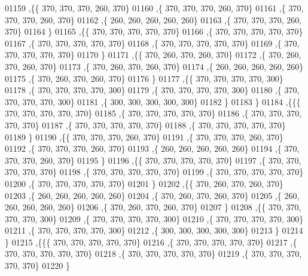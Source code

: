 \begin{DoxyCode}
01159   ,\{\{   370,   370,   370,   260,   370\}
01160    ,\{   370,   370,   370,   260,   370\}
01161    ,\{   370,   370,   370,   260,   370\}
01162    ,\{   260,   260,   260,   260,   260\}
01163    ,\{   370,   370,   370,   260,   370\}
01164    \}
01165   ,\{\{   370,   370,   370,   370,   370\}
01166    ,\{   370,   370,   370,   370,   370\}
01167    ,\{   370,   370,   370,   370,   370\}
01168    ,\{   370,   370,   370,   370,   370\}
01169    ,\{   370,   370,   370,   370,   370\}
01170    \}
01171   ,\{\{   370,   260,   370,   260,   370\}
01172    ,\{   370,   260,   370,   260,   370\}
01173    ,\{   370,   260,   370,   260,   370\}
01174    ,\{   260,   260,   260,   260,   260\}
01175    ,\{   370,   260,   370,   260,   370\}
01176    \}
01177   ,\{\{   370,   370,   370,   370,   300\}
01178    ,\{   370,   370,   370,   370,   300\}
01179    ,\{   370,   370,   370,   370,   300\}
01180    ,\{   370,   370,   370,   370,   300\}
01181    ,\{   300,   300,   300,   300,   300\}
01182    \}
01183   \}
01184  ,\{\{\{   370,   370,   370,   370,   370\}
01185    ,\{   370,   370,   370,   370,   370\}
01186    ,\{   370,   370,   370,   370,   370\}
01187    ,\{   370,   370,   370,   370,   370\}
01188    ,\{   370,   370,   370,   370,   370\}
01189    \}
01190   ,\{\{   370,   370,   370,   260,   370\}
01191    ,\{   370,   370,   370,   260,   370\}
01192    ,\{   370,   370,   370,   260,   370\}
01193    ,\{   260,   260,   260,   260,   260\}
01194    ,\{   370,   370,   370,   260,   370\}
01195    \}
01196   ,\{\{   370,   370,   370,   370,   370\}
01197    ,\{   370,   370,   370,   370,   370\}
01198    ,\{   370,   370,   370,   370,   370\}
01199    ,\{   370,   370,   370,   370,   370\}
01200    ,\{   370,   370,   370,   370,   370\}
01201    \}
01202   ,\{\{   370,   260,   370,   260,   370\}
01203    ,\{   260,   260,   260,   260,   260\}
01204    ,\{   370,   260,   370,   260,   370\}
01205    ,\{   260,   260,   260,   260,   260\}
01206    ,\{   370,   260,   370,   260,   370\}
01207    \}
01208   ,\{\{   370,   370,   370,   370,   300\}
01209    ,\{   370,   370,   370,   370,   300\}
01210    ,\{   370,   370,   370,   370,   300\}
01211    ,\{   370,   370,   370,   370,   300\}
01212    ,\{   300,   300,   300,   300,   300\}
01213    \}
01214   \}
01215  ,\{\{\{   370,   370,   370,   370,   370\}
01216    ,\{   370,   370,   370,   370,   370\}
01217    ,\{   370,   370,   370,   370,   370\}
01218    ,\{   370,   370,   370,   370,   370\}
01219    ,\{   370,   370,   370,   370,   370\}
01220    \}

\end{DoxyCode}
